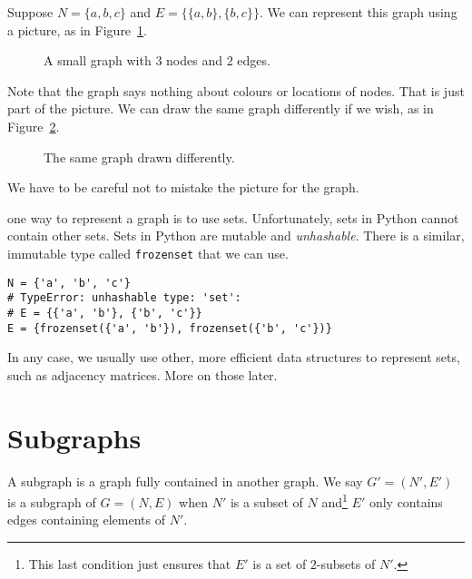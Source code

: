 \documentclass{iansnotes}
\begin{document}
  Suppose $N = \{ a, b, c \}$ and $E = \{ \{a,b\}, \{b,c\} \}$.
  We can represent this graph using a picture, as in Figure~\ref{figure:asmallgraph}.
  \begin{figure}
    \centering
    \caption{A small graph with 3 nodes and 2 edges.}
    \label{figure:asmallgraph}
  \end{figure}
  Note that the graph says nothing about colours or locations of nodes.
  That is just part of the picture.
  We can draw the same graph differently if we wish, as in Figure~\ref{figure:thesamegraph}.
  \begin{figure}
    \centering
    \caption{The same graph drawn differently.}
    \label{figure:thesamegraph}
  \end{figure}
  We have to be careful not to mistake the picture for the graph.

   one way to represent a graph is to use sets.
  Unfortunately, sets in Python cannot contain other sets.
  Sets in Python are mutable and \emph{unhashable}.
  There is a similar, immutable type called \texttt{frozenset} that we can use.
  \begin{verbatim}
N = {'a', 'b', 'c'}
# TypeError: unhashable type: 'set':
# E = {{'a', 'b'}, {'b', 'c'}}
E = {frozenset({'a', 'b'}), frozenset({'b', 'c'})}
  \end{verbatim}
  In any case, we usually use other, more efficient data structures to represent sets, such as adjacency matrices.
  More on those later.

\section{Subgraphs}
  A subgraph is a graph fully contained in another graph.
  We say $G' = (N', E')$ is a subgraph of $G = (N, E)$ when $N'$ is a subset of $N$ and\footnote{This last condition just ensures that $E'$ is a set of $2$-subsets of $N'$.} $E'$ only contains edges containing elements of $N'$.
\end{document}
